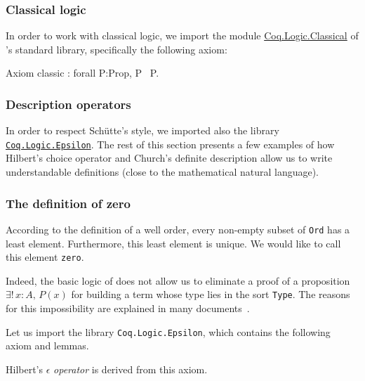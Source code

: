 \subsubsection{Classical logic}

In order to work with classical logic, we import the module
\href{https://coq.inria.fr/distrib/current/stdlib/Coq.Logic.Classical.html}{Coq.Logic.Classical}  of \coq{}'s standard library, specifically the following axiom:

\begin{Coqsrc}
 Axiom classic : forall P:Prop, P \/ ~P.
\end{Coqsrc}


\subsubsection{Description operators}

In order to respect Schütte's style, we imported also the library 
\href{https://coq.inria.fr/distrib/current/stdlib/Coq.Logic.Epsilon.html}{\texttt{Coq.Logic.Epsilon}}.  The rest of this section presents a few examples of
how Hilbert's choice operator and Church's definite description allow us
 to write understandable definitions (close to the mathematical natural language).

\subsubsection{The definition of zero}

According to the  definition of a well order, every non-empty subset of \texttt{Ord} has a least element. Furthermore, this least element is unique. We would like to call this element  \texttt{zero}.







Indeed, the basic logic of  \coq{} does not allow us to eliminate a proof of a proposition 
$\exists!\,x:A,\,P(x)$ for building a term whose type lies in the sort \texttt{Type}. 
The reasons for this impossibility are explained in many documents~\cite{BC04, chlipalacpdt2011, Coq}.

Let us import the library \texttt{Coq.Logic.Epsilon}, which contains the following axiom and lemmas.




Hilbert's $\epsilon$ \emph{operator} is derived from this  axiom.

